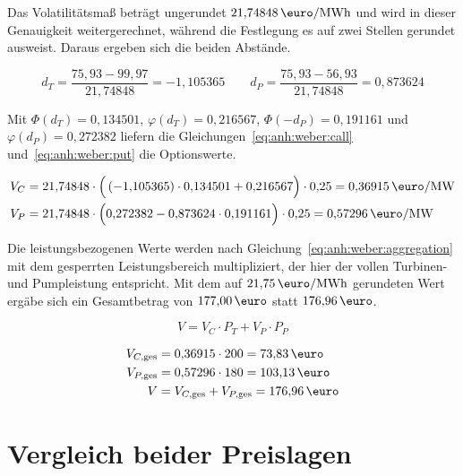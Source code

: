 Das Volatilitätsmaß beträgt ungerundet $21{,}74848\,\si{\text{\euro}\per MWh}$ und wird in dieser Genauigkeit weitergerechnet, während die Festlegung es auf zwei Stellen gerundet ausweist. Daraus ergeben sich die beiden Abstände.

\begin{equation}
  d_T = \frac{75{,}93 - 99{,}97}{21{,}74848} = -1{,}105365
  \qquad
  d_P = \frac{75{,}93 - 56{,}93}{21{,}74848} = 0{,}873624
  \label{eq:anh:weber:beispiel:d}
\end{equation}

Mit $\Phi(d_T) = 0{,}134501$, $\varphi(d_T) = 0{,}216567$, $\Phi(-d_P) = 0{,}191161$ und $\varphi(d_P) = 0{,}272382$ liefern die Gleichungen~\eqref{eq:anh:weber:call} und~\eqref{eq:anh:weber:put} die Optionswerte.

\begin{align}
  V_C &= 21{,}74848 \cdot \Big( \left(-1{,}105365\right) \cdot 0{,}134501 + 0{,}216567 \Big) \cdot 0{,}25 = 0{,}36915\,\si{\text{\euro}\per MW} \label{eq:anh:weber:beispiel:vc}\\
  V_P &= 21{,}74848 \cdot \Big( 0{,}272382 - 0{,}873624 \cdot 0{,}191161 \Big) \cdot 0{,}25 = 0{,}57296\,\si{\text{\euro}\per MW} \label{eq:anh:weber:beispiel:vp}
\end{align}

Die leistungsbezogenen Werte werden nach Gleichung~\eqref{eq:anh:weber:aggregation} mit dem gesperrten Leistungsbereich multipliziert, der hier der vollen Turbinen- und Pumpleistung entspricht. Mit dem auf $21{,}75\,\si{\text{\euro}\per MWh}$ gerundeten Wert ergäbe sich ein Gesamtbetrag von $177{,}00\,\text{\euro}$ statt $176{,}96\,\text{\euro}$.

\begin{equation}
  V = V_C \cdot P_T + V_P \cdot P_P
  \label{eq:anh:weber:aggregation}
\end{equation}

\begin{align}
  V_{C,\mathrm{ges}} &= 0{,}36915 \cdot 200 = 73{,}83\,\text{\euro} \label{eq:anh:weber:beispiel:vcges}\\
  V_{P,\mathrm{ges}} &= 0{,}57296 \cdot 180 = 103{,}13\,\text{\euro} \label{eq:anh:weber:beispiel:vpges}\\
  V &= V_{C,\mathrm{ges}} + V_{P,\mathrm{ges}} = 176{,}96\,\text{\euro} \label{eq:anh:weber:beispiel:vges}
\end{align}

\section{Vergleich beider Preislagen}
\label{anh:weber:vergleich}

